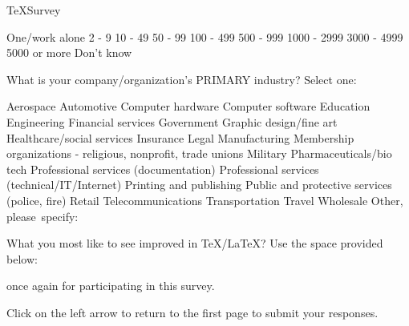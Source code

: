 \documentclass{article}
\begin{document}
\begin{exam}{TeXSurvey}
\begin{problem}
\setlength\columnseprule{0pt}
\begin{multicols}{3}
\begin{answers}{1}
    \bChoices
         One/work alone\eAns
         2 - 9\eAns
         10 - 49\eAns
         50 - 99\eAns
         100 - 499\eAns
         500 - 999\eAns
         1000 - 2999\eAns
         3000 - 4999\eAns
         5000 or more\eAns
         Don't know\eAns
    \eChoices
\end{answers}
\end{multicols}
\end{problem}

\begin{problem}\label{buss2}
What is your company/organization's PRIMARY industry? Select one:

\setlength\columnseprule{0pt}

\begin{multicols}{2}
\begin{answers}{1}
    \bChoices
         Aerospace\eAns
         Automotive\eAns
         Computer hardware\eAns
         Computer software\eAns
         Education\eAns
         Engineering\eAns
         Financial services\eAns
         Government\eAns
         Graphic design/fine art\eAns
         Healthcare/social services\eAns
         Insurance\eAns
         Legal\eAns
         Manufacturing\eAns
         Membership organizations - religious, nonprofit, trade unions\eAns
         Military\eAns
         Pharmaceuticals/bio tech\eAns
         Professional services (documentation)\eAns
         Professional services (technical/IT/Internet)\eAns
         Printing and publishing\eAns
         Public and protective services (police, fire)\eAns
         Retail\eAns
         Telecommunications\eAns
         Transportation\eAns
         Travel\eAns
         Wholesale\eAns
         Other, \mbox{please specify: \fillin{1.25in}{\empty}}\eAns
    \eChoices
\end{answers}
\end{multicols}
\end{problem}

\begin{eqComments}\end{eqComments}

\begin{problem}
What you most like to see improved in \TeX/\LaTeX? Use the space provided
below:
\begin{solution}[2in]
\end{solution}
\end{problem}


\begin{eqComments} once again for participating in this survey.\end{eqComments}
\begin{eqComments}[\GoToSubmit]
Click on the left arrow to return to the first page to submit your responses.\end{eqComments}



\end{exam}
\end{document}

